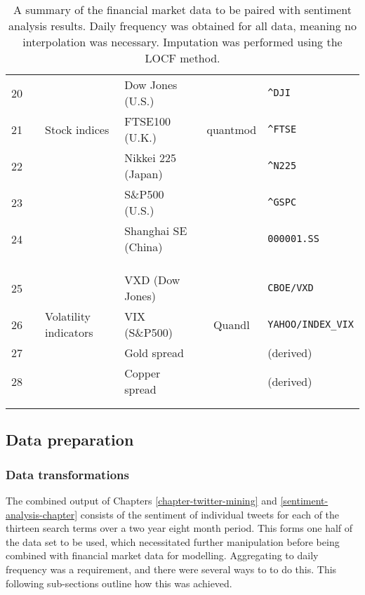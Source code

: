 \documentclass{article}
\begin{document}
\begin{table}
\begin{tabular}{clllcl}
20 &  &  & Dow Jones    (U.S.) &  & \texttt{\textasciicircum{}DJI}\\
21 &  & Stock indices & FTSE100      (U.K.) & quantmod & \texttt{\textasciicircum{}FTSE}\\
22 &  &  & Nikkei 225   (Japan) &  & \texttt{\textasciicircum{}N225}\\
23 &  &  & S\&P500       (U.S.) &  & \texttt{\textasciicircum{}GSPC}\\
24 &  &  & Shanghai SE  (China) &  & \texttt{000001.SS}\\
 &  &  &  &  & \\
 &  &  &  &  & \\
\hline
 &  &  &  &  & \\
25 &  &  & VXD (Dow Jones) &  & \texttt{CBOE/VXD}\\
26 &  & Volatility indicators & VIX (S\&P500) & Quandl & \texttt{YAHOO/INDEX\_VIX}\\
27 &  &  & Gold spread &  & (derived)\\
28 &  &  & Copper spread &  & (derived)\\
 &  &  &  &  & \\
\hline
 &  &  &  &  & \\
\end{tabular}\caption[A breakdown of all financial market data used]{\label{tab:fin-data}A summary of the financial market data to be paired with sentiment analysis results. Daily frequency was obtained for all data, meaning no interpolation was necessary. Imputation was performed using the LOCF method.}

\end{table}


\subsection{Data preparation \label{data_prep}}
\label{sec-6-2}


\subsubsection{Data transformations \label{data-trans}}
\label{sec-6-2-1}

The combined output of Chapters \ref{chapter-twitter-mining} and \ref{sentiment-analysis-chapter} consists of the sentiment of individual tweets for each of the thirteen search terms over a two year eight month period. This forms one half of the data set to be used, which necessitated further manipulation before being combined with financial market data for modelling. Aggregating to daily frequency was a requirement, and there were several ways to to do this. This following sub-sections outline how this was achieved.
\end{document}
